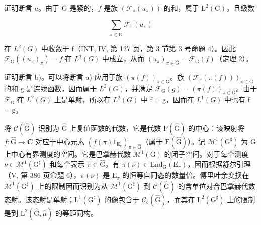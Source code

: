 证明断言 \(a\)。由于 G 是紧的，\(f\) 是族 \((\mathcal{F}_{\pi}(u_{\pi}))\) 的和，属于 \(\mathrm{L}^2 (\mathrm{G})\)，且级数

\[
\sum_ {\pi \in \widehat {\mathrm{G}}} \mathcal {F} _ {\pi} (u _ {\pi})
\]

在 \(L^{2}(G)\) 中收敛于 f（INT, IV, 第 127 页，第 3 节第 3 号命题 4）。因此 \(\mathcal{F}_{\mathrm{G}}((u_{\pi})_{\pi}) = f\) 在 \(L^{2}(G)\) 中成立，从而 \((u_{\pi})_{\pi \in \widehat{\mathrm{G}}} = \overline{\mathcal{F}}_{\mathrm{G}}(f)\)（定理 2）。

证明断言 b)。可以将断言 a) 应用于族 \((\pi(f))_{\pi \in \widehat{\mathrm{G}}}\)。族 \((\mathcal{F}_{\pi}(\pi(f)))_{\pi \in \widehat{\mathrm{G}}}\) 的和 g 是连续函数，因而属于 \(L^{2}(G)\)，并满足 \(\overline{\mathcal{F}}_{\mathrm{G}}(g) = (\pi(f))_{\pi \in \widehat{\mathrm{G}}}\)。由于 \(\overline{\mathcal{F}}_{\mathrm{G}}\) 在 \(L^{2}(G)\) 上是单射，所以在 \(L^{2}(G)\) 中 f = g，因而在 \(L^{1}(G)\) 中也有 f = g。

将 \(\mathcal{C}(\widehat{\mathrm{G}})\) 识别为 \(\widehat{\mathrm{G}}\) 上复值函数的代数，它是代数 \(\mathrm{F}(\widehat{\mathrm{G}})\) 的中心：该映射将 \(f\colon \widehat{\mathrm{G}}\to \mathbf{C}\) 对应于中心元素 \((f(\pi)1_{\mathrm{E}_{\pi}})_{\pi \in \widehat{\mathrm{G}}}\)（属于 \(\mathrm{F}(\widehat{\mathrm{G}})\)）。记 \(\mathcal{M}^1 (\mathrm{G}^\sharp)\) 为 G 上中心有界测度的空间。它是巴拿赫代数 \(\mathcal{M}^1 (\mathrm{G})\) 的闭子空间。对于每个测度 \(\nu \in \mathcal{M}^1 (\mathrm{G}^\sharp)\) 和每个表示 \(\pi \in \widehat{\mathrm{G}}\)，有 \(\pi (\nu)\in \mathrm{End}_{\mathrm{G}}(\mathrm{E}_{\pi})\)，因而根据舒尔引理（V, 第 386 页命题 6），\(\pi (\nu)\) 是 \(\mathrm{E}_{\pi}\) 的恒等自同态的数量倍。傅里叶余变换在 \(\mathcal{M}^1 (\mathrm{G}^\sharp)\) 上的限制因而识别为从 \(\mathcal{M}^1 (\mathrm{G}^\sharp)\) 到 \(\mathcal{C}(\widehat{\mathrm{G}})\) 的含单位对合巴拿赫代数态射。该态射是单射；\(\mathrm{L}^1 (\mathrm{G}^\sharp)\) 的像包含于 \(\mathcal{C}_b(\widehat{\mathrm{G}})\)，而其在 \(\mathrm{L}^2 (\mathrm{G}^\sharp)\) 上的限制是到 \(\mathrm{L}^2 (\widehat{\mathrm{G}},\widehat{\mu})\) 的等距同构。

